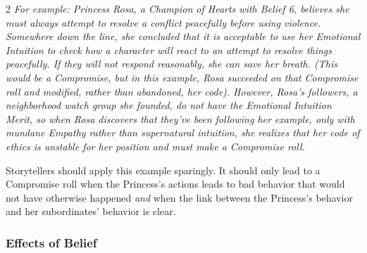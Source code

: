 \begin{multicols}{2}
\textit{For example: Princess Rosa, a Champion of Hearts with Belief 6, believes she must always attempt to resolve a conflict peacefully before using violence. Somewhere down the line, she concluded that it is acceptable to use her Emotional Intuition to check how a character will react to an attempt to resolve things peacefully. If they will not respond reasonably, she can save her breath. (This would be a Compromise, but in this example, Rosa succeeded on that Compromise roll and modified, rather than abandoned, her code). However, Rosa's followers, a neighborhood watch group she founded, do not have the Emotional Intuition Merit, so when Rosa discovers that they've been following her example, only with mundane Empathy rather than supernatural intuition, she realizes that her code of ethics is unstable for her position and must make a Compromise roll.}

Storytellers should apply this example sparingly. It should only lead to a Compromise roll when the Princess's actions leads to bad behavior that would not have otherwise happened \textit{and} when the link between the Princess's behavior and her subordinates' behavior is clear. 


\subsubsection*{Effects of Belief}



\end{multicols}
